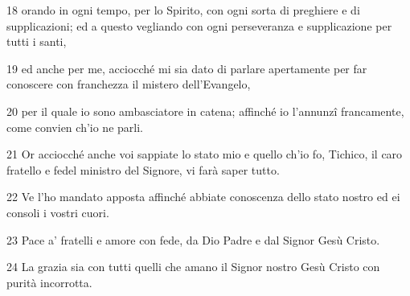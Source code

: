 \par 18 orando in ogni tempo, per lo Spirito, con ogni sorta di preghiere e di supplicazioni; ed a questo vegliando con ogni perseveranza e supplicazione per tutti i santi,
\par 19 ed anche per me, acciocché mi sia dato di parlare apertamente per far conoscere con franchezza il mistero dell'Evangelo,
\par 20 per il quale io sono ambasciatore in catena; affinché io l'annunzî francamente, come convien ch'io ne parli.
\par 21 Or acciocché anche voi sappiate lo stato mio e quello ch'io fo, Tichico, il caro fratello e fedel ministro del Signore, vi farà saper tutto.
\par 22 Ve l'ho mandato apposta affinché abbiate conoscenza dello stato nostro ed ei consoli i vostri cuori.
\par 23 Pace a' fratelli e amore con fede, da Dio Padre e dal Signor Gesù Cristo.
\par 24 La grazia sia con tutti quelli che amano il Signor nostro Gesù Cristo con purità incorrotta.


